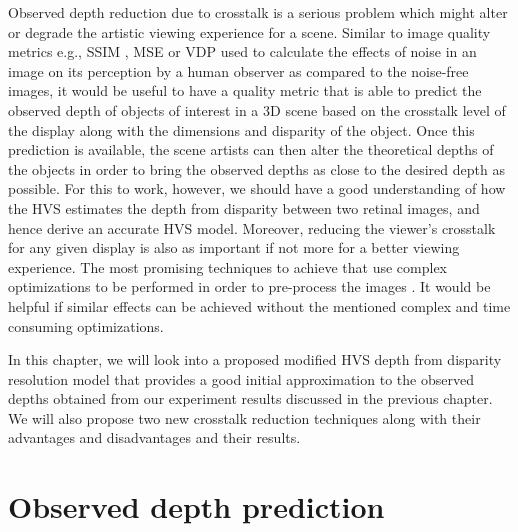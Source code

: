 Observed depth reduction due to crosstalk is a serious problem which might alter or degrade the artistic viewing experience for a scene. Similar to image quality metrics e.g., SSIM \cite{wang2004image}, MSE\cite{ wiki:MSE} or VDP\cite{mantiuk2004visible} used to calculate the effects of noise in an image on its perception by a human observer as compared to the noise-free images, it would be useful to have a quality metric that is able to predict the observed depth of objects of interest in a 3D scene based on the crosstalk level of the display along with the dimensions and disparity of the object. Once this prediction is available, the scene artists can then alter the theoretical depths of the objects in order to bring the observed depths as close to the desired depth as possible. For this to work, however, we should have a good understanding of how the HVS estimates the depth from disparity between two retinal images, and hence derive an accurate HVS model. Moreover, reducing the viewer's crosstalk for any given display is also as important if not more for a better viewing experience. The most promising techniques to achieve that use complex optimizations to be performed in order to pre-process the images \cite{van2011perceptually}. It would be helpful if similar effects can be achieved without the mentioned complex and time consuming optimizations.

In this chapter, we will look into a proposed modified HVS depth from disparity resolution model that provides a good initial approximation to the observed depths obtained from our experiment results discussed in the previous chapter. We will also propose two new crosstalk reduction techniques along with their advantages and disadvantages and their results.

\section{Observed depth prediction}

